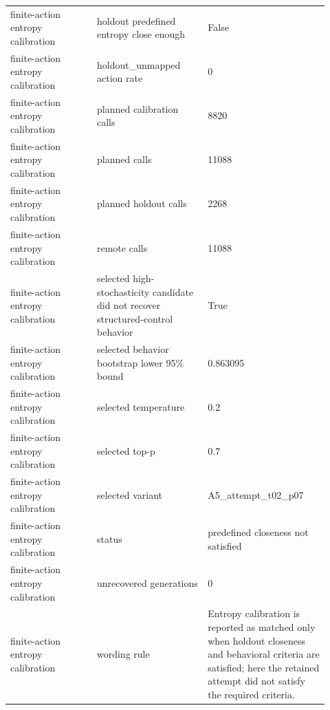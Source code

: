 \documentclass[11pt]{article}
\begin{document}
\begin{longtable}{@{}L{0.250\linewidth}L{0.320\linewidth}L{0.350\linewidth}@{}}
finite-action entropy calibration & holdout predefined entropy close enough & False \\
finite-action entropy calibration & holdout\_unmapped action rate & 0 \\
finite-action entropy calibration & planned calibration calls & 8820 \\
finite-action entropy calibration & planned calls & 11088 \\
finite-action entropy calibration & planned holdout calls & 2268 \\
finite-action entropy calibration & remote calls & 11088 \\
finite-action entropy calibration & selected high-stochasticity candidate did not recover structured-control behavior & True \\
finite-action entropy calibration & selected behavior bootstrap lower 95\% bound & 0.863095 \\
finite-action entropy calibration & selected temperature & 0.2 \\
finite-action entropy calibration & selected top-p & 0.7 \\
finite-action entropy calibration & selected variant & A5\_attempt\_t02\_p07 \\
finite-action entropy calibration & status & predefined closeness not satisfied \\
finite-action entropy calibration & unrecovered generations & 0 \\
finite-action entropy calibration & wording rule & Entropy calibration is reported as matched only when holdout closeness and behavioral criteria are satisfied; here the retained attempt did not satisfy the required criteria. \\
\end{longtable}
\normalsize
\end{document}

